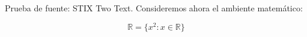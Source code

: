 \documentclass{article}
\begin{document}
Prueba de fuente: STIX Two Text. Consideremos ahora el ambiente matemático:

\[
\mathbb{R} = \{x^2 : x \in \mathbb{R} \}
\]
\end{document}
